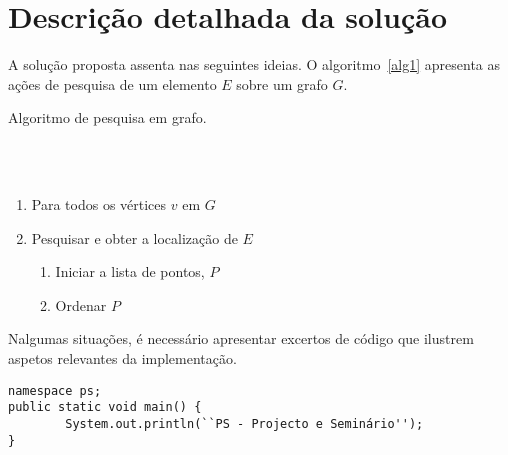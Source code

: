 \section{Descrição detalhada da solução} \label{sec33}
A solução proposta assenta nas seguintes ideias. O algoritmo~\ref{alg1}
apresenta as ações de pesquisa de um elemento $E$ sobre um grafo $G$.
\begin{algorithm}
    \caption{Algoritmo de pesquisa em grafo.}
    \label{alg1}
    \\
    \\
    \begin{enumerate}
        \item Para todos os vértices $v$ em $G$
        \item Pesquisar e obter a localização de $E$
        \begin{enumerate}
            \item Iniciar a lista de pontos, $P$
            \item Ordenar $P$
        \end{enumerate}
    \end{enumerate}
\end{algorithm}

\newpage
Nalgumas situações, é necessário apresentar excertos de
código que ilustrem aspetos relevantes da implementação.

\begin{verbatim}
namespace ps;
public static void main() {
		System.out.println(``PS - Projecto e Seminário'');
}
\end{verbatim}
